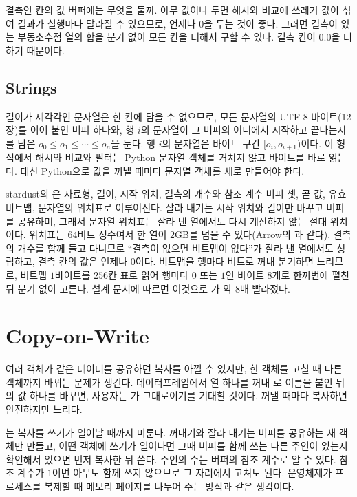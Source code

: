 결측인 칸의 값 버퍼에는 무엇을 둘까. 아무 값이나 두면 해시와 비교에 쓰레기 값이 섞여 결과가 실행마다 달라질 수 있으므로, 언제나 $0$을 두는 것이 좋다. 그러면 결측이 있는 부동소수점 열의 합을 분기 없이 모든 칸을 더해서 구할 수 있다. 결측 칸이 $0.0$을 더하기 때문이다.

\subsection{Strings}

길이가 제각각인 문자열은 한 칸에 담을 수 없으므로, 모든 문자열의 UTF-8 바이트(12장)를 이어 붙인 버퍼 하나와, 행 $i$의 문자열이 그 버퍼의 어디에서 시작하고 끝나는지를 담은  $o_0\le o_1\le\cdots\le o_n$을 둔다. 행 $i$의 문자열은 바이트 구간 $[o_i,o_{i+1})$이다. 이 형식에서 해시와 비교와 필터는 Python 문자열 객체를 거치지 않고 바이트를 바로 읽는다. 대신 Python으로 값을 꺼낼 때마다 문자열 객체를 새로 만들어야 한다.

\begin{instardust}
stardust의 은 자료형, 길이, 시작 위치, 결측의 개수와 참조 계수 버퍼 셋, 곧 값, 유효 비트맵, 문자열의 위치표로 이루어진다. 잘라 내기는 시작 위치와 길이만 바꾸고 버퍼를 공유하며, 그래서 문자열 위치표는 잘라 낸 열에서도 다시 계산하지 않는 절대 위치이다. 위치표는 $64$비트 정수여서 한 열이 $2$GB를 넘을 수 있다(Arrow의 과 같다). 결측의 개수를 함께 들고 다니므로 ``결측이 없으면 비트맵이 없다''가 잘라 낸 열에서도 성립하고, 결측 칸의 값은 언제나 $0$이다. 비트맵을 행마다 비트로 꺼내 분기하면 느리므로, 비트맵 $1$바이트를 $256$칸 표로 읽어 행마다 $0$ 또는 $1$인 바이트 $8$개로 한꺼번에 펼친 뒤 분기 없이 고른다. 설계 문서에 따르면 이것으로 가 약 $8$배 빨라졌다.
\end{instardust}

\section{Copy-on-Write}
\label{sec:cow}

여러 객체가 같은 데이터를 공유하면 복사를 아낄 수 있지만, 한 객체를 고칠 때 다른 객체까지 바뀌는 문제가 생긴다. 데이터프레임에서 열 하나를 꺼내 로 이름을 붙인 뒤 의 값 하나를 바꾸면, 사용자는 가 그대로이기를 기대할 것이다. 꺼낼 때마다 복사하면 안전하지만 느리다.

는 복사를 쓰기가 일어날 때까지 미룬다. 꺼내기와 잘라 내기는 버퍼를 공유하는 새 객체만 만들고, 어떤 객체에 쓰기가 일어나면 그때 버퍼를 함께 쓰는 다른 주인이 있는지 확인해서 있으면 먼저 복사한 뒤 쓴다. 주인의 수는 버퍼의 참조 계수로 알 수 있다. 참조 계수가 $1$이면 아무도 함께 쓰지 않으므로 그 자리에서 고쳐도 된다. 운영체제가 프로세스를 복제할 때 메모리 페이지를 나누어 주는 방식과 같은 생각이다.

